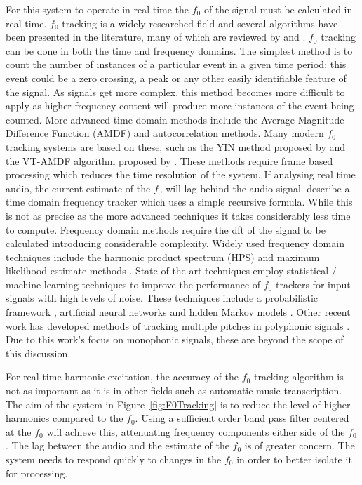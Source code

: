 		For this system to operate in real time the $f_{0}$ of the signal must be calculated in real time.  $f_{0}$
		tracking is a widely researched field and several algorithms have been presented in the literature, many of
		which are reviewed by \citet{cuadra2001efficient} and \citet{gerhard2003pitch}.  $f_{0}$ tracking can be
		done in both the time and frequency domains. The simplest method is to count the number of instances of a
		particular event in a given time period: this event could be a zero crossing, a peak or any other easily
		identifiable feature of the signal. As signals get more complex, this method becomes more difficult to
		apply as higher frequency content will produce more instances of the event being counted. More advanced
		time domain methods include the Average Magnitude Difference Function (AMDF) and autocorrelation methods.
		Many modern $f_{0}$ tracking systems are based on these, such as the YIN method proposed by
		\citet{decheveigne2002yin} and the VT-AMDF algorithm proposed by \citet{prukkanon2009vt-amdf}.  These
		methods require frame based processing which reduces the time resolution of the system. If analysing real
		time audio, the current estimate of the $f_{0}$ will lag behind the audio signal. \citet{larsen2004audio}
		describe a time domain frequency tracker which uses a simple recursive formula. While this is not as
		precise as the more advanced techniques it takes considerably less time to compute. Frequency domain
		methods require the \acrshort{dft} of the signal to be calculated introducing considerable complexity.
		Widely used frequency domain techniques include the harmonic product spectrum (HPS) and maximum likelihood
		estimate methods \citep{noll1969pitch}. State of the art techniques employ statistical / machine learning
		techniques to improve the performance of $f_{0}$ trackers for input signals with high levels of noise.
		These techniques include a probabilistic framework \citep{chu2012safe}, artificial neural networks
		\citep{han2014neural} and hidden Markov models \citep{wang2016f0}. Other recent work has developed methods
		of tracking multiple pitches in polyphonic signals \citep{christensen2008multi}.  Due to this work's focus
		on monophonic signals, these are beyond the scope of this discussion.

		For real time harmonic excitation, the accuracy of the $f_{0}$ tracking algorithm is not as important as it
		is in other fields such as automatic music transcription. The aim of the system in
		Figure~\ref{fig:F0Tracking} is to reduce the level of higher harmonics compared to the $f_{0}$. Using a
		sufficient order band pass filter centered at the $f_{0}$ will achieve this, attenuating frequency
		components either side of the $f_{0}$. The lag between the audio and the estimate of the $f_{0}$ is of
		greater concern. The system needs to respond quickly to changes in the $f_{0}$ in order to better isolate
		it for processing.

